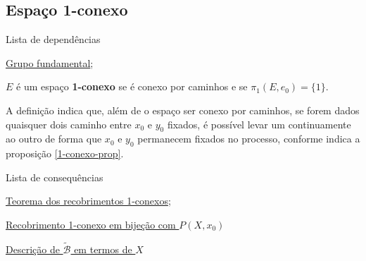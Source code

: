 \subsection{Espaço 1-conexo}
\label{espaço-1-conexo-def}
\begin{titlemize}{Lista de dependências}
	\item \hyperref[grupo-fundamental-def]{Grupo fundamental};\\ %
\end{titlemize}

\begin{defi}
	$E$ é um espaço \textbf{1-conexo} se é conexo por caminhos e se $\pi_1(E, e_0)=\{1\}$.
\end{defi}

A definição indica que, além de o espaço ser conexo por caminhos, se forem dados quaisquer dois caminho entre $x_0$ e $y_0$ fixados, é possível levar um continuamente ao outro de forma que $x_0$ e $y_0$ permanecem fixados no processo, conforme indica a proposição \ref{1-conexo-prop}.

\begin{titlemize}{Lista de consequências}
	\item \hyperref[recobrimento-1-conexo-prop]{Teorema dos recobrimentos 1-conexos};\\ %
	\item \hyperref[recobrimento-1-conexo-em-bijecao-com-P(X,x)]{Recobrimento 1-conexo em bijeção com $P(X,x_0)$}
 	\item \hyperref[descrição-da-base-do-recobrimento-prop]{Descrição de $\tilde{\mathcal{B}}$ em termos de $X$}
\end{titlemize}
